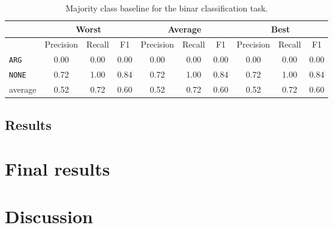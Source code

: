 \begin{table}[h]
                \centering
\caption{Majority class baseline for the binar classification task.}
\label{tbl:bin_maj}
 \begin{tabular}{@{}lccccccccc@{}}
              \toprule
               & \multicolumn{3}{c}{Worst} & \multicolumn{3}{c}{Average} & \multicolumn{3}{c}{Best}  \\ \midrule
               & Precision  & Recall & F1   & Precision  & Recall  & F1    & Precision & Recall & F1   \\ \toprule
\texttt{ARG}	 & 0.00	 & 0.00	 & 0.00	 &0.00	 & 0.00	 & 0.00	 &0.00	 & 0.00	 & 0.00	 \\ 
\texttt{NONE}	 & 0.72	 & 1.00	 & 0.84	 &0.72	 & 1.00	 & 0.84	 &0.72	 & 1.00	 & 0.84	 \\ \midrule 
average	 & 0.52	 & 0.72	 & 0.60	 &0.52	 & 0.72	 & 0.60	 &0.52	 & 0.72	 & 0.60	 \\ \bottomrule

    \end{tabular}
\end{table}

\subsection{Results}

\section{Final results}
\label{sec:final}

\section{Discussion}